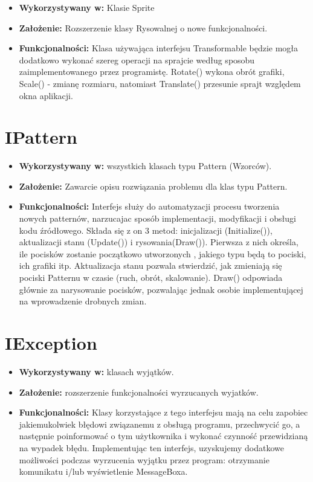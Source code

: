 \documentclass[a4paper,twoside]{article}
\begin{document}
\begin{itemize}
	\item \textbf{Wykorzystywany w:} Klasie Sprite
	\item \textbf{Założenie:} Rozszerzenie klasy Rysowalnej o nowe funkcjonalności.
	\item \textbf{Funkcjonalności:} Klasa używająca interfejsu Transformable będzie mogła dodatkowo wykonać szereg operacji na sprajcie według sposobu zaimplementowanego przez programistę. Rotate() wykona obrót grafiki, Scale() - zmianę rozmiaru, natomiast Translate() przesunie sprajt względem okna aplikacji.
\end{itemize}

\section{IPattern}

\begin{itemize}
\item \textbf{Wykorzystywany w:} wszystkich klasach typu Pattern (Wzorców).
\item \textbf{Założenie:} Zawarcie opisu rozwiązania problemu dla klas typu Pattern.
\item \textbf{Funkcjonalności:} Interfejs służy do automatyzacji procesu tworzenia nowych patternów, narzucajac sposób implementacji, modyfikacji i obsługi kodu źródłowego. Składa się z on 3 metod: inicjalizacji (Initialize()), aktualizacji stanu (Update()) i rysowania(Draw()). Pierwsza z nich określa, ile pocisków zostanie początkowo utworzonych , jakiego typu będą to pociski, ich grafiki itp. Aktualizacja stanu pozwala stwierdzić, jak zmieniają się pociski Patternu w czasie (ruch, obrót, skalowanie). Draw() odpowiada głównie za narysowanie pocisków, pozwalając jednak osobie implementującej na wprowadzenie drobnych zmian.
\end{itemize}

\section{IException}

\begin{itemize}
\item \textbf{Wykorzystywany w:} klasach wyjątków.
\item \textbf{Założenie:} rozszerzenie funkcjonalności wyrzucanych wyjatków.
\item \textbf{Funkcjonalności:} Klasy korzystające z tego interfejsu mają na celu zapobiec jakiemukolwiek błędowi związanemu z obsługą programu, przechwycić go, a następnie poinformować o tym użytkownika i wykonać czynność przewidzianą na wypadek błędu. Implementując ten interfejs, uzyskujemy dodatkowe możliwości podczas wyrzucenia wyjątku przez program: otrzymanie komunikatu i/lub wyświetlenie MessageBoxa. 
\end{itemize}
\end{document}
